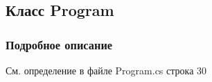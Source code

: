 \subsection{Класс Program}
\label{classkdz__manager_1_1_program}


\subsubsection{Подробное описание}


См. определение в файле Program.\+cs строка 30


